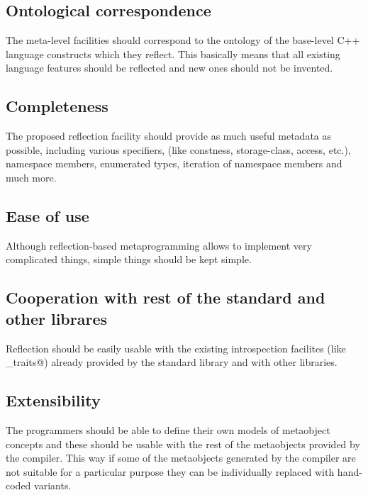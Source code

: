 \subsection{Ontological correspondence}

The meta-level facilities should
correspond to the ontology of the base-level C++ language constructs
which they reflect. This basically means that all existing language
features should be reflected and new ones should not be invented.

\subsection{Completeness}

The proposed reflection facility should
provide as much useful metadata as possible, including various specifiers,
(like constness, storage-class, access, etc.), namespace members,
enumerated types, iteration of namespace members and much more.

\subsection{Ease of use}

Although reflection-based metaprogramming
allows to implement very complicated things, simple things
should be kept simple.

\subsection{Cooperation with rest of the standard and other librares}

Reflection should be easily
usable with the existing introspection facilites (like \verb@type_traits@)
already provided by the standard library and with other libraries.

\subsection{Extensibility}

The programmers should be able to define their own models of metaobject concepts
and these should be usable with the rest of the metaobjects provided by the
compiler. This way if some of the metaobjects generated by the compiler are not
suitable for a particular purpose they can be individually replaced with
hand-coded variants.
